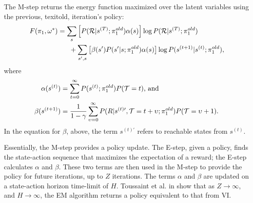     \par
    The M-step returns the energy function maximized over the latent variables using the previous, texit{old},
    iteration's policy:
    \begin{equation} \label{M_step}
        \begin{split}
            F(\pi_{1},\omega^*)
                & = \sum_s \left[ P(\mathcal{R}|s^{(T)};\pi_{1}^{old})\alpha(s)\right]
                        \log P(\mathcal{R}|s^{(T)};\pi_{1}^{old}) \\
                &\quad\ \ + \sum_{s',s}\left[ \beta(s')P(s'|s;\pi_{1}^{old})\alpha(s)\right]
                        \log P(s^{(t+1)}|s^{(t)};\pi_{1}^{old}),
        \end{split}
    \end{equation}
    where
    \begin{align*}
        \alpha(s^{(t)}) & = \sum_{t=0}^\infty P(s^{(t)}; \pi_{1}^{old})P(\mathcal{T}=t) \text{, and}\\
        \beta(s^{(t+1)}) & = \frac{1}{1-\gamma} \sum_{\upsilon=0}^{\infty}
            P(R|s^{(t)\prime},\mathcal{T}=t+\upsilon;\pi_{1}^{old})P(\mathcal{T}=\upsilon+1).
    \end{align*}
    \noindent
    In the equation for $\beta$, above, the term $s^{(t)\prime}$ refers to reachable states from $s^{(t)}$.

    Essentially, the M-step provides a policy update. The E-step, given a policy, finds the state-action sequence that
    maximizes the expectation of a reward; the E-step calculates $\alpha$ and $\beta$. These two terms are then used in
    the M-step to provide the policy for future iterations, up to $Z$ iterations. The terms $\alpha$ and $\beta$ are
    updated on a state-action horizon time-limit of $H$.  Toussaint et al. in \cite{toussaint2010expectation} show that
    as $Z\rightarrow{}\infty$, and $H\rightarrow{}\infty$, the EM algorithm returns a policy equivalent to that from VI.

